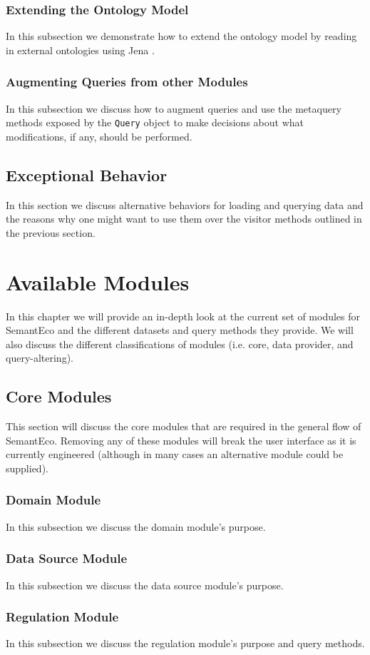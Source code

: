 \documentclass[letterpaper]{report}
\begin{document}
\subsection{Extending the Ontology Model}
In this subsection we demonstrate how to extend the ontology model by reading in external ontologies using Jena \cite{Jena}.
\subsection{Augmenting Queries from other Modules}
In this subsection we discuss how to augment queries and use the metaquery methods exposed by the \texttt{Query} object to make decisions about what modifications, if any, should be performed.
\section{Exceptional Behavior}
In this section we discuss alternative behaviors for loading and querying data and the reasons why one might want to use them over the visitor methods outlined in the previous section.
\chapter{Available Modules}
In this chapter we will provide an in-depth look at the current set of modules for SemantEco and the different datasets and query methods they provide. We will also discuss the different classifications of modules (i.e. core, data provider, and query-altering).
\section{Core Modules}
This section will discuss the core modules that are required in the general flow of SemantEco. Removing any of these modules will break the user interface as it is currently engineered (although in many cases an alternative module could be supplied).
\subsection{Domain Module}
In this subsection we discuss the domain module's purpose.
\subsection{Data Source Module}
In this subsection we discuss the data source module's purpose.
\subsection{Regulation Module}
In this subsection we discuss the regulation module's purpose and query methods.
\end{document}
